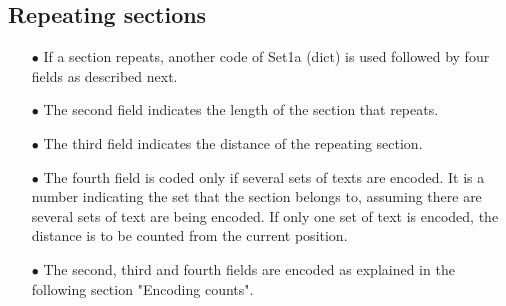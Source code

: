 \documentclass[]{article}
\begin{document}
\subsection{Repeating sections}
\begin{itemize}
	\item[$\bullet$] If a section repeats, another code of Set1a (dict) is used followed by four fields as described next.
    \item[$\bullet$] The second field indicates the length of the section that repeats.
	\item[$\bullet$] The third field indicates the distance of the repeating section.
	\item[$\bullet$] The fourth field is coded only if several sets of texts are encoded.  It is a number indicating the set that the section belongs to, assuming there are several sets of text are being encoded.  If only one set of text is encoded, the distance is to be counted from the current position.
	\item[$\bullet$] The second, third and fourth fields are encoded as explained in the following section "Encoding counts".
\end{itemize}
\end{document}

